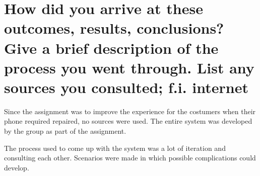 \section{How did you arrive at these outcomes, results, conclusions? Give a brief description of the process you went through. List any sources you consulted; f.i. internet}

Since the assignment was to improve the experience for the costumers when their phone required repaired, no sources were used. The entire system was developed by the group as part of the assignment.

The process used to come up with the system was a lot of iteration and consulting each other. Scenarios were made in which possible complications could develop.